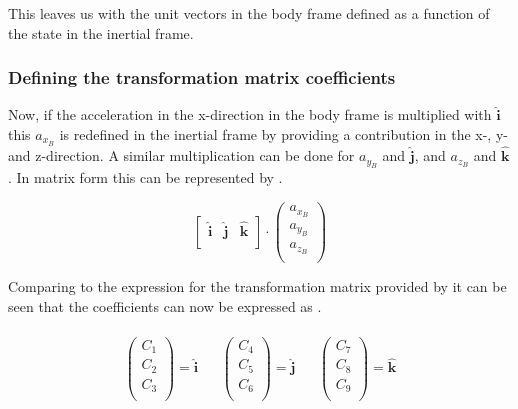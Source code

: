 This leaves us with the unit vectors in the body frame defined as a function of the state in the inertial frame. 

\subsubsection{Defining the transformation matrix coefficients}
\label{subsubsec:filTransMat}
Now, if the acceleration in the x-direction in the body frame is multiplied with $\mathbf{\hat{i}}$ this $a_{x_{B}}$ is redefined in the inertial frame by providing a contribution in the x-, y- and z-direction. A similar multiplication can be done for $a_{y_{B}}$ and $\mathbf{\hat{j}}$, and $a_{z_{B}}$ and $\mathbf{\hat{k}}$. In matrix form this can be represented by .

\begin{equation} \label{eq:firstFillEx}
\left[
\begin{matrix}
\mathbf{\hat{i}} &
\mathbf{\hat{j}} &
\mathbf{\hat{k}} \\
\end{matrix}
\right]
\cdot
\begin{pmatrix}
a_{x_{B}} \\
a_{y_{B}} \\
a_{z_{B}} \\
\end{pmatrix}
\end{equation}

Comparing  to the expression for the transformation matrix provided by  it can be seen that the coefficients can now be expressed as .

\begin{align} \label{eq:transCoeff}
\begin{split}
\begin{pmatrix}
C_{1} \\
C_{2} \\
C_{3} \\
\end{pmatrix}
=
\mathbf{\hat{i}}
\end{split}
&
\begin{split}
\begin{pmatrix}
C_{4} \\
C_{5} \\
C_{6} \\
\end{pmatrix}
=
\mathbf{\hat{j}}
\end{split}
&
\begin{split}
\begin{pmatrix}
C_{7} \\
C_{8} \\
C_{9} \\
\end{pmatrix}
=
\mathbf{\hat{k}}
\end{split}
\end{align}

